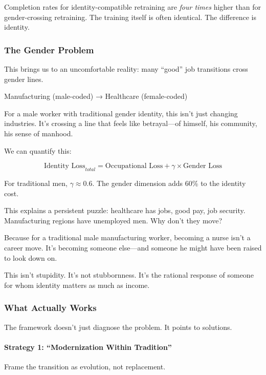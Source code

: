 Completion rates for identity-compatible retraining are \emph{four times} 
higher than for gender-crossing retraining. The training itself is 
often identical. The difference is identity.

\subsubsection{The Gender Problem}

This brings us to an uncomfortable reality: many ``good'' job transitions 
cross gender lines.

Manufacturing (male-coded) → Healthcare (female-coded)

For a male worker with traditional gender identity, this isn't just 
changing industries. It's crossing a line that feels like betrayal---of 
himself, his community, his sense of manhood.

We can quantify this:

\begin{equation*}
\text{Identity Loss}_{total} = \text{Occupational Loss} + \gamma \times \text{Gender Loss}
\end{equation*}

For traditional men, $\gamma \approx 0.6$. The gender dimension adds 
60\% to the identity cost.

This explains a persistent puzzle: healthcare has jobs, good pay, 
job security. Manufacturing regions have unemployed men. Why don't 
they move?

Because for a traditional male manufacturing worker, becoming a 
nurse isn't a career move. It's becoming someone else---and someone 
he might have been raised to look down on.

This isn't stupidity. It's not stubbornness. It's the rational response 
of someone for whom identity matters as much as income.

\subsubsection{What Actually Works}

The framework doesn't just diagnose the problem. It points to solutions.

\paragraph{Strategy 1: ``Modernization Within Tradition''}

Frame the transition as evolution, not replacement.

